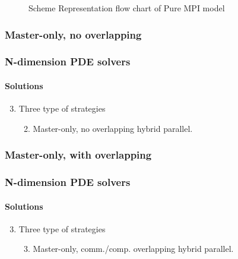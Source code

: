 \begin{frame}
\begin{figure}[htbp]

    \caption{Scheme Representation flow chart of Pure MPI model}
    \label{<label>}
  \end{figure}

\end{frame}


\subsubsection{Master-only, no overlapping}
\begin{frame}
  \frametitle{N-dimension PDE solvers}
  \framesubtitle{Solutions}
  \begin{enumerate}
    \setcounter{enumi}{2}
    \item Three type of strategies
    \begin{enumerate}
      \setcounter{enumi}{1}
      \item Master-only, no overlapping hybrid parallel.
    \end{enumerate}
  \end{enumerate}
\end{frame}


\subsubsection{Master-only, with overlapping}
\begin{frame}
  \frametitle{N-dimension PDE solvers}
  \framesubtitle{Solutions}
  \begin{enumerate}
    \setcounter{enumi}{2}
    \item Three type of strategies
    \begin{enumerate}
      \setcounter{enumi}{2}
      \item Master-only, comm./comp. overlapping hybrid parallel.
    \end{enumerate}
  \end{enumerate}
\end{frame}

